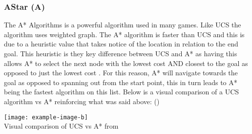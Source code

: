 \subsubsection{AStar (A\*)}
The A* Algorithms is a powerful algorithm used in many games. Like UCS the algorithm uses weighted graph. The A* algorithm is faster than UCS and this is due to a heuristic value that takes notice of the location in relation to the end goal. This heuristic is they key difference between UCS and A* as having this allows A* to select the next node with the lowest cost AND closest to the goal as opposed to just the lowest cost \citetemp. For this reason, A* will navigate towards the goal as opposed to spanning out from the start point, this in turn leads to A* being the fastest algorithm on this list. 
Below is a visual comparison of a UCS algorithm vs A* reinforcing what was said above: (\cite{majumder_2013_a})
\begin{center}
	\texttt{[image: example-image-b]}\\
	Visual comparison of UCS vs A* from \citetemp
\end{center}

